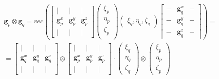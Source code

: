 \begin{multline}
    \mathbf{g}_p \otimes \mathbf{g}_q =
    vec\left(
        \begin{bmatrix}
            |              & |              & |              \\
            \mathbf{g}_p^x & \mathbf{g}_p^y & \mathbf{g}_p^z \\
            |              & |              & |
        \end{bmatrix}
        \left( \begin{array}{ccc}
                \xi_p \\
                \eta_p \\
                \zeta_p \\
            \end{array}
        \right)
        \left(\begin{array}{ccc}
                \xi_q,
                \eta_q,
                \zeta_q
            \end{array}
        \right)
        \begin{bmatrix}
            -             & \mathbf{g}_q^x & -   \\
            -             & \mathbf{g}_q^y & -   \\
            -             & \mathbf{g}_q^z & -
        \end{bmatrix}
    \right) = \\
  = \begin{bmatrix}
        |                 & |              & |              \\
        \mathbf{g}_q^x    & \mathbf{g}_q^y & \mathbf{g}_q^z \\
        |                 & |              & |
    \end{bmatrix}
    \otimes
    \begin{bmatrix}
        |                 & |              & |              \\
        \mathbf{g}_p^x    & \mathbf{g}_p^y & \mathbf{g}_p^z \\
        |                 & |              & |
    \end{bmatrix}
    \cdot
    \left(\begin{array}{ccc}
            \xi_q\\
            \eta_q\\
            \zeta_q
        \end{array}
    \right)
    \otimes
    \left(\begin{array}{ccc}
            \xi_p\\
            \eta_p\\
            \zeta_p
        \end{array}
    \right)
    \label{eq:kron_topo_free_or}
\end{multline}


